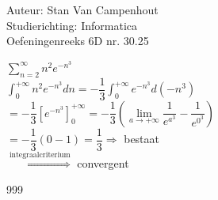 \documentclass[a4paper]{article}
\begin{document}
  
\noindent \large Auteur: Stan Van Campenhout \\
\noindent \large Studierichting:  Informatica\\
\noindent \large Oefeningenreeks 6D nr. 30.25\\

\medskip

\normalsize

$ \displaystyle\sum\limits_{n = 2}^\infty n^2e^{-n^3} $\\

$ \displaystyle\int_0^{+\infty}n^2e^{-n^3}dn = -\dfrac{1}{3}\displaystyle\int_0^{+\infty}e^{-n^3}d\left(-n^3\right) $\\

$ = -\dfrac{1}{3}\left[e^{-n^3}\right]_0^{+\infty} = -\dfrac{1}{3}\left(\lim\limits_{a\rightarrow+\infty}\dfrac{1}{e^{a^3}} - \dfrac{1}{e^{0^3}}\right) $\\

$ = -\dfrac{1}{3}\left(0 - 1\right) = \dfrac{1}{3} \Rightarrow $ bestaat \\

$ \stackrel{\text{integraalcriterium}}{\Rightarrow} $ convergent \\

\begin{thebibliography}{999}
\end{thebibliography}
\end{document}
